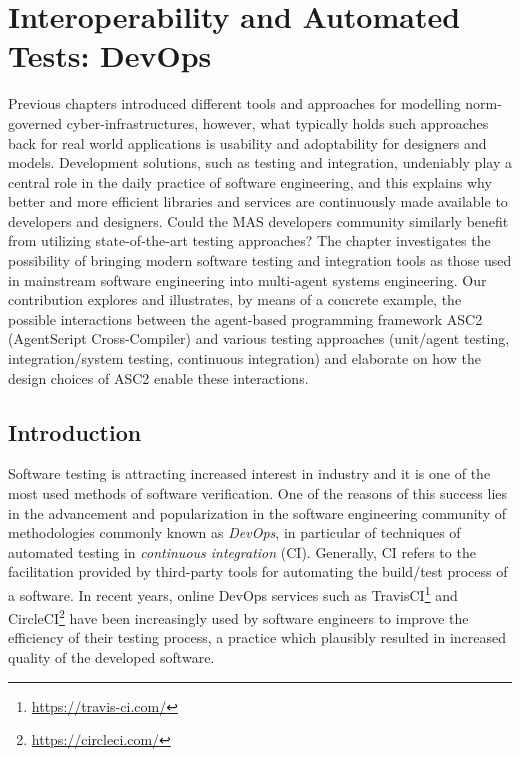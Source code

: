 \chapter{Interoperability and Automated Tests: DevOps}

Previous chapters introduced different tools and approaches for modelling norm-governed cyber-infrastructures, however, what typically holds such approaches back for real world applications is usability and adoptability for designers and models. Development solutions, such as testing and integration, undeniably play a central role in the daily practice of software engineering, and this explains why better and more efficient libraries and services are continuously made available to developers and designers. Could the MAS developers community similarly benefit from utilizing state-of-the-art testing approaches? The chapter investigates the possibility of bringing  modern software testing and integration tools as those used in mainstream software engineering into multi-agent systems engineering. Our contribution explores and illustrates, by means of a concrete example, the possible interactions between the agent-based programming framework ASC2 (AgentScript Cross-Compiler)  and various testing approaches (unit/agent testing, integration/system testing, continuous integration) and elaborate on how the design choices of ASC2 enable these interactions.


\section{Introduction}

Software testing is attracting increased interest in industry \cite{market_reports_2019} and it is one of the most used methods of software verification. One of the reasons of this success lies in the advancement and popularization in the software engineering community of methodologies commonly known as \textit{DevOps}, in particular of techniques of automated testing in \textit{continuous integration} (CI). Generally, CI refers to the facilitation provided by third-party tools for automating the build/test process of a software. In recent years, online DevOps services such as TravisCI\footnote{\url{https://travis-ci.com/}} and CircleCI\footnote{\url{https://circleci.com/}} have been increasingly used by software engineers to improve the efficiency of their testing process, a practice which plausibly resulted in increased quality of the developed software.

